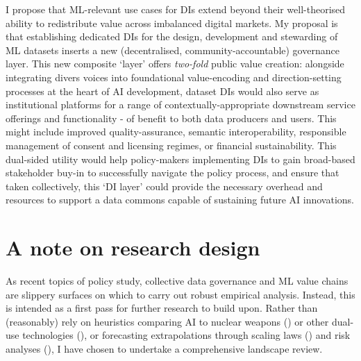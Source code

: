 I propose that ML-relevant use cases for DIs extend beyond their well-theorised ability to redistribute value across imbalanced digital markets. My proposal is that establishing dedicated DIs for the design, development and stewarding of ML datasets inserts a new (decentralised, community-accountable) governance layer. This new composite `layer’ offers \textit{two-fold} public value creation: alongside integrating divers voices into foundational value-encoding and direction-setting processes at the heart of AI development, dataset DIs would also serve as institutional platforms for a range of contextually-appropriate downstream service offerings and functionality - of benefit to both data producers and users. This might include improved quality-assurance, semantic interoperability, responsible management of consent and licensing regimes, or financial sustainability. This dual-sided utility would help policy-makers implementing DIs to gain broad-based stakeholder buy-in to successfully navigate the policy process, and ensure that taken collectively, this `DI layer’ could provide the necessary overhead and resources to support a data commons capable of sustaining future AI innovations. 
 
\section*{A note on research design}

As recent topics of policy study, collective data governance and ML value chains are slippery surfaces on which to carry out robust empirical analysis. Instead, this is intended as a first pass for further research to build upon. Rather than (reasonably) rely on heuristics comparing AI to nuclear weapons (\cite{2023NuclearGovernanceModel}) or other dual-use technologies  (\cite{ulnicane2021GoodGovernanceResponse}), or forecasting extrapolations through scaling laws (\cite{villalobos2022WillWeRunb, kaplan2020ScalingLawsNeural}) and risk analyses (\cite{bostrom2017StrategicImplicationsOpenness}), I have chosen to undertake a comprehensive landscape review. 


